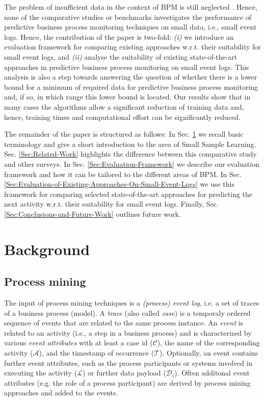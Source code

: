 \documentclass[runningheads]{llncs}
\begin{document}
The problem of insufficient data in the context of BPM is still neglected \cite{Kaeppel2020SSL}. Hence, none of the comparative studies or benchmarks investigates the performance of predictive business process monitoring techniques on small data, i.e., small event logs. Hence, the  contribution of the paper is two-fold: \textit{(i)} we introduce an evaluation framework for comparing existing approaches w.r.t. their suitability for small event logs, and \textit{(ii)} analyse the suitability of existing state-of-the-art approaches in predictive business process monitoring on small event logs. This analysis is also a step towards answering the question of whether there is a lower bound for a minimum of required data for predictive business process monitoring and, if so, in which range this lower bound is located. Our results show that in many cases the algorithms allow a significant reduction of training data and, hence, training times and computational effort can be significantly reduced.

The remainder of the paper is structured as follows: In Sec. \ref{Sec:Background} we recall basic terminology and give a short introduction to the area of Small Sample Learning. Sec. \ref{Sec:Related-Work} highlights the difference between this comparative study and other surveys. In Sec. \ref{Sec:Evaluation-Framework} we describe our evaluation framework and how it can be tailored to the different areas of BPM. In Sec. \ref{Sec:Evaluation-of-Existing-Approaches-On-Small-Event-Logs} we use this framework for comparing selected state-of-the-art approaches for predicting the next activity w.r.t. their suitability for small event logs. Finally, Sec. \ref{Sec:Conclusions-and-Future-Work} outlines future work.

\vspace{-7pt}
\section{Background}\label{Sec:Background}
\subsection{Process mining}\label{SubSec:ProcessMining}
The input of process mining techniques is a \textit{(process) event log}, i.e. a set of traces of a business process (model). A \textit{trace} (also called \textit{case}) is a temporaly ordered sequence of events that are related to the same process instance. An \textit{event} is related to an activity (i.e., a step in a business process) and is characterized by various \textit{event attributes} with at least a case id ($\mathcal{C}$), the name of the corresponding activity ($\mathcal{A}$), and the timestamp of occurrence ($\mathcal{T}$). Optionally, an event contains further event attributes, such as the process participants or systems involved in executing the activity ($\mathcal{L}$) or further data payload ($\mathcal{D}_i$). Often additonal event attributes (e.g. the role of a process participant) are derived by process mining approaches and added to the events.
\end{document}

